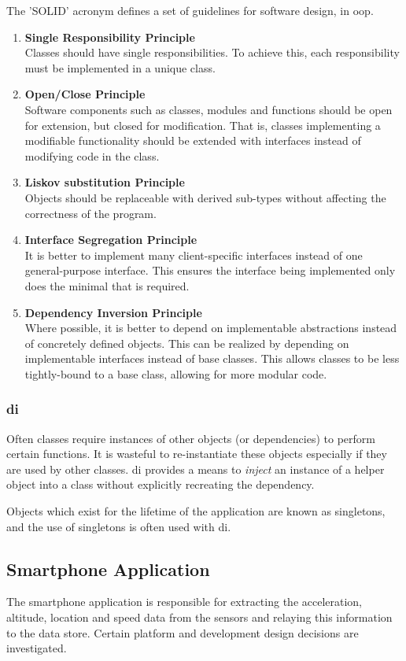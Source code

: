 The 'SOLID' acronym defines a set of guidelines for software design, in \ac{oop}.
\begin{enumerate}
\item \textbf{Single Responsibility Principle}\\
Classes should have single responsibilities. 
To achieve this, each responsibility must be implemented in a unique class.
\item \textbf{Open/Close Principle}\\
Software components such as classes, modules and functions should be open for extension, but closed for modification.
That is, classes implementing a modifiable functionality should be extended with interfaces instead of modifying code in the class.
\item \textbf{Liskov substitution Principle}\\
Objects should be replaceable with derived sub-types without affecting the correctness of the program.
\item \textbf{Interface Segregation Principle}\\
It is better to implement many client-specific interfaces instead of one general-purpose interface.
This ensures the interface being implemented only does the minimal that is required.
\item \textbf{Dependency Inversion Principle}\\
Where possible, it is better to depend on implementable abstractions instead of concretely defined objects.
This can be realized by depending on implementable interfaces instead of base classes.
This allows classes to be less tightly-bound to a base class, allowing for more modular code.
\end{enumerate}
\cite{chebanyuk2016approach}

\subsubsection{\Ac{di}}
Often classes require instances of other objects (or dependencies) to perform certain functions.
It is wasteful to re-instantiate these objects especially if they are used by other classes.
\Ac{di} provides a means to \textit{inject} an instance of a helper object into a class without explicitly recreating the dependency.
\cite{kocsis2017dependency}

Objects which exist for the lifetime of the application are known as singletons, and the use of singletons is often used with \ac{di}.

\subsection{Smartphone Application}
The smartphone application is responsible for extracting the acceleration, altitude, location and speed data from the sensors and relaying this information to the data store.
Certain platform and development design decisions are investigated.


